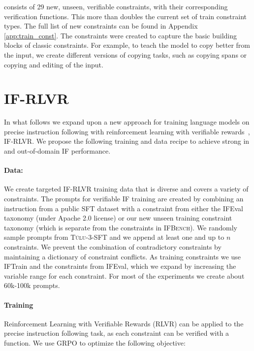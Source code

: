 \documentclass{article}
\newcommand{\benchname}{\textsc{IFBench}\xspace}
\newcommand{\tulu}{\textsc{T\"ulu}\xspace}
\begin{document}
consists of 29 new, unseen, verifiable constraints, with their corresponding verification functions. This more than doubles the current set of train constraint types. The full list of new constraints can be found in Appendix \ref{app:train_const}. The constraints were created to capture the basic building blocks of classic constraints. For example, to teach the model to copy better from the input, we create different versions of copying tasks, such as copying spans or copying and editing of the input.  


\section{IF-RLVR}
\label{sec:prompts}
\label{sec:grpo_hyperparameters}
In what follows we expand upon a new approach for training language models on precise instruction following with reinforcement learning with verifiable rewards~\cite{lambert2024t}, IF-RLVR.
We propose the following training and data recipe to achieve strong in and out-of-domain IF performance.

\paragraph{Data:} We create targeted IF-RLVR training data that is diverse and covers a variety of constraints. The prompts for verifiable IF training are created by combining an instruction from a public SFT dataset with a constraint from either the IFEval taxonomy (under Apache 2.0 license) or our new unseen training constraint taxonomy (which is separate from the constraints in \benchname). We randomly sample prompts from \tulu-3-SFT \cite{lambert2024t} and we append at least one and up to $n$ constraints. We prevent the combination of contradictory constraints by maintaining a dictionary of constraint conflicts. As training constraints we use IFTrain and the constraints from IFEval, which we expand by increasing the variable range for each constraint. For most of the experiments we create about 60k-100k prompts.


\paragraph{Training}
Reinforcement Learning with Verifiable Rewards (RLVR) \cite{lambert2024t} can be applied to the precise instruction following task, as each constraint can be verified with a function.
We use GRPO \cite{shao2024deepseekmath} to optimize the following objective:
\end{document}
